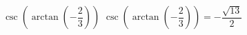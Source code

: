  {$\csc\left(\arctan\left(-\dfrac{2}{3}\right)\right)$ }
{ $\csc\left(\arctan\left(-\dfrac{2}{3}\right)\right) = -\dfrac{\sqrt{13}}{2}$}
